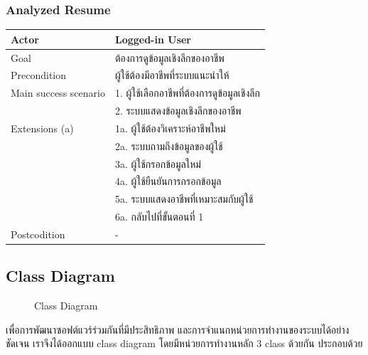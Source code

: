 \subsubsection{Analyzed Resume}
\begin{table}[H]
    \begin{tabular*}{\textwidth}{l|l} \hline
        Actor                 & Logged-in User                  \\ \hline
        Goal                  & ต้องการดูข้อมูลเชิงลึกของอาชีพ         \\ \hline
        Precondition          & ผู้ใช้ต้องมีอาชีพที่ระบบแนะนำให้          \\ \hline
        Main success scenario & 1. ผู้ใช้เลือกอาชีพที่ต้องการดูข้อมูลเชิงลึก \\
        & 2. ระบบแสดงข้อมูลเชิงลึกของอาชีพ     \\ \hline
        Extensions (a)        & 1a. ผู้ใช้ต้องวิเคราะห์อาชีพใหม่        \\
        & 2a. ระบบถามถึงข้อมูลของผู้ใช้         \\
        & 3a. ผู้ใช้กรอกข้อมูลใหม่              \\
        & 4a. ผู้ใช้ยืนยันการกรอกข้อมูล          \\
        & 5a. ระบบแสดงอาชีพที่เหมาะสมกับผู้ใช้   \\
        & 6a. กลับไปที่ขั้นตอนที่ 1              \\ \hline
        Postcodition          & -                               \\ \hline
    \end{tabular*}
\end{table}

\subsection{Class Diagram}
\begin{figure}[H]\centering
    \setlength{\fboxrule}{0.2mm} %
    \setlength{\fboxsep}{0.5cm}
    \caption{Class Diagram}\label{fig:class_diagram}
\end{figure}
เพื่อการพัฒนาซอฟต์แวร์ร่วมกันที่มีประสิทธิภาพ และการจำแนกหน่วยการทำงานของระบบได้อย่างชัดเจน เราจึงได้ออกแบบ class diagram โดยมีหน่วยการทำงานหลัก 3 class ด้วยกัน ประกอบด้วย

